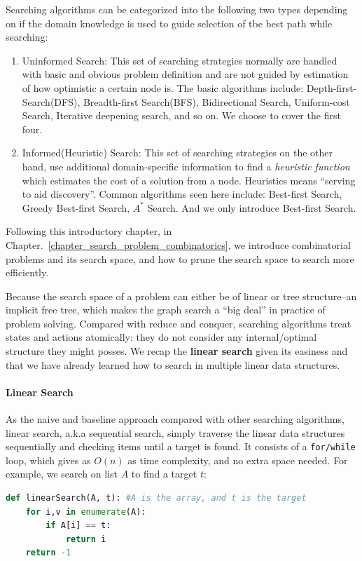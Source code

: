 \documentclass[main.tex]{subfiles}
\begin{document}
Searching algorithms can be categorized into the following two types depending on if the domain knowledge is used to guide selection of tbe best path while searching:
\begin{enumerate}
    \item Uninformed Search: This set of searching strategies  normally are handled with basic and obvious problem definition and are not guided by estimation of how optimistic a certain node is. The basic algorithms include: Depth-first-Search(DFS), Breadth-first Search(BFS),  Bidirectional Search, Uniform-cost Search, Iterative deepening search, and so on. We choose to cover the first four. 
    \item Informed(Heuristic) Search: This set of searching strategies on the other hand, use additional domain-specific information to find a \textit{heuristic function} which estimates the cost of a solution from a node. Heuristics means ``serving to aid discovery''. Common algorithms seen here include: Best-first Search, Greedy Best-first Search, $A^{*}$ Search. And we only introduce Best-first Search. 
\end{enumerate}


Following this introductory chapter, in Chapter.~\ref{chapter_search_problem_combinatorics}, we introduce combinatorial problems and its search space, and how to prune the search space to search more efficiently. 

Because the search space of a problem can either be of linear or tree structure--an implicit free tree, which makes the graph search a ``big deal'' in practice of problem solving. Compared with reduce and conquer, searching algorithms treat states and actions atomically: they do not consider any internal/optimal structure they might posses. We recap the \textbf{linear search} given its easiness and that we have already learned how to search in multiple linear data structures. 

\paragraph{Linear Search} As the naive and baseline approach compared with other searching algorithms, linear search, a.k.a sequential search, simply traverse the linear data structures sequentially and checking items until a target is found. It consists of a \texttt{for/while} loop, which gives as $O(n)$ as time complexity, and no extra space needed. For example, we search on list $A$ to find a target $t$:
\begin{lstlisting}[language=Python]
def linearSearch(A, t): #A is the array, and t is the target
    for i,v in enumerate(A):
        if A[i] == t:
            return i
    return -1
\end{lstlisting}
\end{document}

